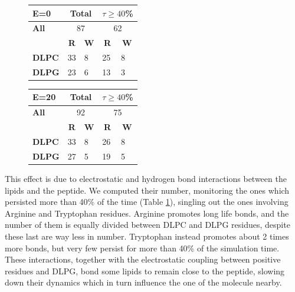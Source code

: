 \begin{figure}[h!]
\centering
 \def\arraystretch{1.6}
\begin{tabular}{l|ll|ll}
\hline
\textbf{E=0} & \multicolumn{2}{c|}{Total} & \multicolumn{2}{c}{$\displaystyle\tau \ge 40$\%} \\
\hline
\textbf{All} & \multicolumn{2}{c|}{87} & \multicolumn{2}{c}{62} \\
\hline
\hline
  & \multicolumn{1}{c}{\textbf{R}} & \multicolumn{1}{c|}{\textbf{W}} & \multicolumn{1}{c}{\textbf{R}} & \multicolumn{1}{c}{\textbf{W}} \\
 \hline
 \textbf{DLPC} & 33 & 8 & 25 & 8 \\
 \textbf{DLPG} & 23 & 6 & 13 & 3 \\
 \hline
 \end{tabular}
 \hspace{0.4cm}
 \begin{tabular}{l|ll|ll}
 \hline
\textbf{E=20} & \multicolumn{2}{c|}{Total} & \multicolumn{2}{c}{$\displaystyle\tau \ge 40$\%} \\
\hline
\textbf{All} & \multicolumn{2}{c|}{92} & \multicolumn{2}{c}{75} \\
\hline
\hline
 & \multicolumn{1}{c}{\textbf{R}} & \multicolumn{1}{c|}{\textbf{W}} & \multicolumn{1}{c}{\textbf{R}} & \multicolumn{1}{c}{\textbf{W}} \\
 \hline
 \textbf{DLPC} & 33 & 8 & 26 & 8 \\
 \textbf{DLPG} & 27 & 5 & 19 & 5 \\
 \hline
 \end{tabular}
\label{table:hb_pr_lip}
\vspace{1cm}
\end{figure}

This effect is due to electrostatic and hydrogen bond interactions between the lipids and the peptide. We computed their number, monitoring the ones which persisted more than 40\% of the time (Table \ref{table:hb_pr_lip}), singling out the ones involving Arginine and Tryptophan residues.
%
Arginine promotes long life bonds, and the number of them is equally divided between DLPC and DLPG residues, despite these last are way less in number. Tryptophan instead promotes about 2 times more bonds, but very few persist for more than 40\% of the simulation time.
%
These interactions, together with the electrostatic coupling between positive residues and DLPG, bond some lipids to remain close to the peptide, slowing down their dynamics which in turn influence the one of the molecule nearby.

